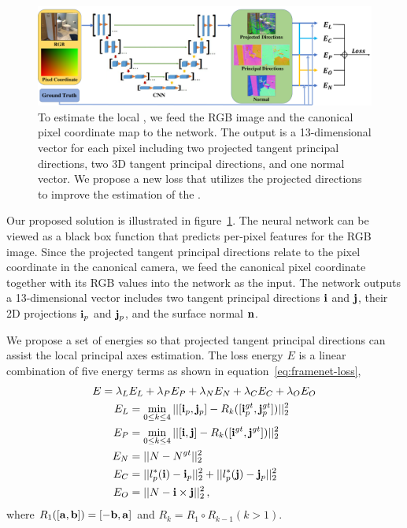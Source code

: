 \begin{figure}
    \centering
    \includegraphics[width=\linewidth]{FrameNet/graph/architecture.pdf}
    \caption{To estimate the local \cframe{}, we feed the RGB image and the canonical pixel coordinate map to the network. The output is a 13-dimensional vector for each pixel including two projected tangent principal directions, two 3D tangent principal directions, and one normal vector. We propose a new loss that utilizes the projected directions to improve the estimation of the \cframe{}.}
    \label{fig:framenet-architecture}
\end{figure}
Our proposed solution is illustrated in figure~\ref{fig:framenet-architecture}. The neural network can be viewed as a black box function that predicts per-pixel features for the RGB image. Since the projected tangent principal directions relate to the pixel coordinate in the canonical camera, we feed the canonical pixel coordinate together with its RGB values into the network as the input. The network outputs a 13-dimensional vector includes two tangent principal directions $\mathbf{i}$ and $\mathbf{j}$, their 2D projections $\mathbf{i}_p$ and $\mathbf{j}_p$, and the surface normal $\mathbf{n}$.

We propose a set of energies so that projected tangent principal directions can assist the local principal axes estimation. The loss energy $E$ is a linear combination of five energy terms as shown in equation~\ref{eq:framenet-loss},
\begin{align}
\begin{split}
  E = \lambda_L &E_L + \lambda_P E_P + \lambda_N E_N + \lambda_C E_C + \lambda_O E_O\\
  E_L &= \min_{0\leq k \le 4} ||[\mathbf{i}_p,\mathbf{j}_p] - R_k([\mathbf{i}_p^{gt},\mathbf{j}_p^{gt}])||_2^2\\
  E_P &= \min_{0\leq k \le 4} ||[\mathbf{i},\mathbf{j}] - R_k([\mathbf{i}^{gt},\mathbf{j}^{gt}])||_2^2\\
  E_N &= ||N - N^{gt}||_2^2\\
  E_C &= ||l^*_p(\mathbf{i}) - \mathbf{i}_p||_2^2+||l^*_p(\mathbf{j}) - \mathbf{j}_p||_2^2\\
  E_O &= ||N - \mathbf{i}\times\mathbf{j}||_2^2\,, \\
\end{split}
\label{eq:framenet-loss}
\end{align}
where $R_1([\mathbf{a},\mathbf{b}])=[-\mathbf{b},\mathbf{a}]$ and $R_k = R_1\circ R_{k-1} (k>1)$.

